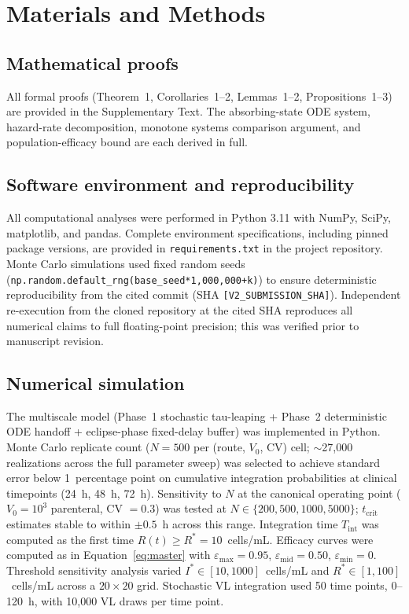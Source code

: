 \documentclass[11pt]{article}
\theoremstyle{definition}
\theoremstyle{remark}
\newcommand{\Tint}{T_{\text{int}}}
\newcommand{\tcrit}{t_{\text{crit}}}
\newcommand{\emax}{\varepsilon_{\max}}
\newcommand{\emid}{\varepsilon_{\text{mid}}}
\newcommand{\emin}{\varepsilon_{\min}}
\begin{document}
\section*{Materials and Methods}

\subsection*{Mathematical proofs}
All formal proofs (Theorem~1, Corollaries~1--2, Lemmas~1--2, Propositions~1--3) are provided in the Supplementary Text. The absorbing-state ODE system, hazard-rate decomposition, monotone systems comparison argument, and population-efficacy bound are each derived in full.

\subsection*{Software environment and reproducibility}
All computational analyses were performed in Python 3.11 with NumPy, SciPy, matplotlib, and pandas. Complete environment specifications, including pinned package versions, are provided in \texttt{requirements.txt} in the project repository. Monte Carlo simulations used fixed random seeds (\texttt{np.random.default\_rng(base\_seed*1{,}000{,}000+k)}) to ensure deterministic reproducibility from the cited commit (SHA \texttt{[V2\_SUBMISSION\_SHA]}). Independent re-execution from the cloned repository at the cited SHA reproduces all numerical claims to full floating-point precision; this was verified prior to manuscript revision.

\subsection*{Numerical simulation}
The multiscale model (Phase~1 stochastic tau-leaping + Phase~2 deterministic ODE handoff + eclipse-phase fixed-delay buffer) was implemented in Python. Monte Carlo replicate count ($N = 500$ per (route, $V_{0}$, CV) cell; $\sim$27{,}000 realizations across the full parameter sweep) was selected to achieve standard error below 1~percentage point on cumulative integration probabilities at clinical timepoints (24~h, 48~h, 72~h). Sensitivity to $N$ at the canonical operating point ($V_{0} = 10^{3}$ parenteral, CV $= 0.3$) was tested at $N \in \{200, 500, 1000, 5000\}$; $\tcrit$ estimates stable to within $\pm 0.5$~h across this range. Integration time $\Tint$ was computed as the first time $R(t) \geq R^{*} = 10$~cells/mL. Efficacy curves were computed as in Equation~\ref{eq:master} with $\emax = 0.95$, $\emid = 0.50$, $\emin = 0$. Threshold sensitivity analysis varied $I^{*} \in [10, 1000]$~cells/mL and $R^{*} \in [1, 100]$~cells/mL across a $20 \times 20$ grid. Stochastic VL integration used 50 time points, 0--120~h, with 10{,}000 VL draws per time point.
\end{document}
